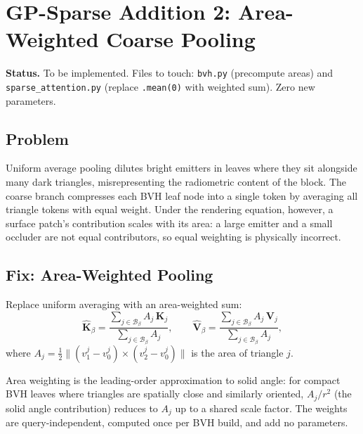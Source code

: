 \documentclass[11pt,letterpaper]{article}
\newcommand{\code}[1]{\texttt{#1}}
\begin{document}
\section{GP-Sparse Addition 2: Area-Weighted Coarse Pooling}
\label{sec:supporting}

\begin{mdframed}[linecolor=black!30, backgroundcolor=gray!5]
\textbf{Status.} To be implemented.
Files to touch: \code{bvh.py} (precompute areas) and
\code{sparse\_attention.py} (replace \code{.mean(0)} with weighted sum).
Zero new parameters.
\end{mdframed}

\subsection{Problem}

Uniform average pooling dilutes bright emitters in leaves where they
sit alongside many dark triangles, misrepresenting the radiometric
content of the block.
The coarse branch compresses each BVH leaf node into a single token
by averaging all triangle tokens with equal weight.
Under the rendering equation, however, a surface patch's contribution
scales with its area: a large emitter and a small occluder are not
equal contributors, so equal weighting is physically incorrect.

\subsection{Fix: Area-Weighted Pooling}

Replace uniform averaging with an area-weighted sum:
\begin{equation}
  \hat{\mathbf{K}}_\beta
    = \frac{\sum_{j \in \mathcal{B}_\beta} A_j\,\mathbf{K}_j}
           {\sum_{j \in \mathcal{B}_\beta} A_j},
  \qquad
  \hat{\mathbf{V}}_\beta
    = \frac{\sum_{j \in \mathcal{B}_\beta} A_j\,\mathbf{V}_j}
           {\sum_{j \in \mathcal{B}_\beta} A_j},
  \label{eq:area_pool}
\end{equation}
where $A_j = \tfrac{1}{2}\|(v_1^j - v_0^j)\times(v_2^j - v_0^j)\|$
is the area of triangle $j$.

Area weighting is the leading-order approximation to solid angle:
for compact BVH leaves where triangles are spatially close and similarly
oriented, $A_j / r^2$ (the solid angle contribution) reduces to $A_j$
up to a shared scale factor.
The weights are query-independent, computed once per BVH build, and
add no parameters.
\end{document}
